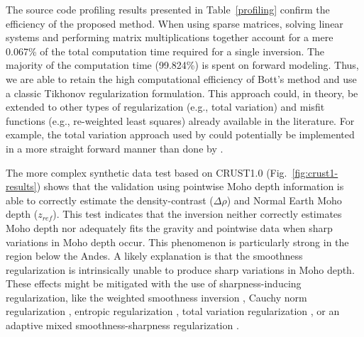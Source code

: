 \documentclass[extra,mreferee]{gji}
\begin{document}
The source code profiling results presented in Table~\ref{profiling}
confirm the efficiency of the proposed method.
When using sparse matrices, solving linear systems and performing matrix
multiplications together account for a mere 0.067\% of the total computation
time required for a single inversion.
The majority of the computation time (99.824\%) is spent on forward modeling.
Thus, we are able to retain the high computational efficiency of Bott's method
and use a classic Tikhonov regularization formulation.
This approach could, in theory, be extended to other types of regularization
(e.g., total variation) and misfit functions (e.g., re-weighted least squares)
already available in the literature.
For example, the total variation approach used by \citet{martins2011} could
potentially be implemented in a more straight forward manner than done by
\citet{santos2015}.

The more complex synthetic data test based on CRUST1.0
(Fig.~\ref{fig:crust1-results})
shows that the validation using pointwise Moho depth information
is able to correctly estimate the density-contrast ($\Delta\rho$) and Normal
Earth Moho depth ($z_{ref}$).
This test indicates that the inversion neither correctly estimates Moho depth
nor adequately fits the gravity and pointwise data when sharp variations in
Moho depth occur.
This phenomenon is particularly strong in the region below the Andes.
A likely explanation is that the smoothness regularization
is intrinsically unable to produce sharp variations in Moho depth.
These effects might be mitigated with the use of sharpness-inducing
regularization, like
the weighted smoothness inversion \citep{barbosa1999a},
Cauchy norm regularization \citep{sacchi1996, pilkington2008},
entropic regularization \citep{silva2010},
total variation regularization \citep{martins2011},
or an adaptive mixed smoothness-sharpness regularization \citep{sun2014}.
\end{document}
